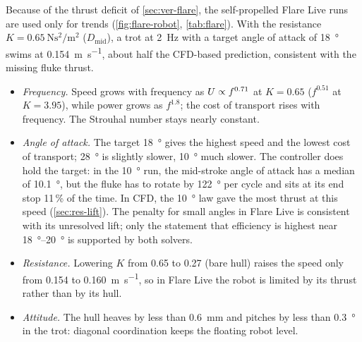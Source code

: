 Because of the thrust deficit of \cref{sec:ver-flare}, the self-propelled Flare Live runs are used only for trends
(\cref{fig:flare-robot}, \cref{tab:flare}). With the resistance $K=\SI{0.65}{\newton\second\squared\per\metre\squared}$
($D_\text{mid}$), a trot at \SI{2}{\hertz} with a target angle of attack of \SI{18}{\degree} swims at
\SI{0.154}{\metre\per\second}, about half the CFD-based prediction, consistent with the missing fluke thrust.
\begin{itemize}
  \item \emph{Frequency.} Speed grows with frequency as $U\propto f^{0.71}$ at $K=0.65$ ($f^{0.51}$ at $K=3.95$), while power grows
        as $f^{1.8}$; the cost of transport rises with frequency. The Strouhal number stays nearly constant.
  \item \emph{Angle of attack.} The target \SI{18}{\degree} gives the highest speed and the lowest cost of transport; \SI{28}{\degree}
        is slightly slower, \SI{10}{\degree} much slower. The controller does hold the target: in the \SI{10}{\degree} run, the
        mid-stroke angle of attack has a median of \SI{10.1}{\degree}, but the fluke has to rotate by \SI{122}{\degree} per cycle and
        sits at its end stop 11\,\% of the time. In CFD, the \SI{10}{\degree} law gave the most thrust at this speed
        (\cref{sec:res-lift}). The penalty for small angles in Flare Live is consistent with its unresolved lift; only the statement
        that efficiency is highest near \SIrange{18}{20}{\degree} is supported by both solvers.
  \item \emph{Resistance.} Lowering $K$ from 0.65 to 0.27 (bare hull) raises the speed only from \SI{0.154}{} to
        \SI{0.160}{\metre\per\second}, so in Flare Live the robot is limited by its thrust rather than by its hull.
  \item \emph{Attitude.} The hull heaves by less than \SI{0.6}{\milli\metre} and pitches by less than \SI{0.3}{\degree} in the trot:
        diagonal coordination keeps the floating robot level.
\end{itemize}

